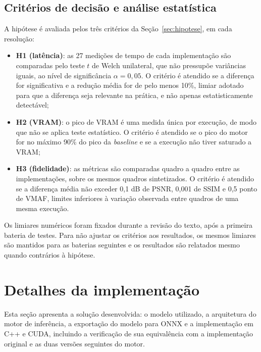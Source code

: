 \documentclass[
    12pt,                %
    openright,           %
    oneside,             %
    a4paper,             %
    english,             %
    brazil               %
]{abntex2}
\begin{document}
\subsection{Critérios de decisão e análise estatística}
\label{sec:criterios}

A hipótese é avaliada pelos três critérios da Seção~\ref{sec:hipotese}, em cada resolução:

\begin{itemize}
    \item \textbf{H1 (latência)}: as 27 medições de tempo de cada implementação são comparadas pelo teste $t$ de Welch unilateral, que não pressupõe variâncias iguais, ao nível de significância $\alpha = 0{,}05$. O critério é atendido se a diferença for significativa e a redução média for de pelo menos 10\%, limiar adotado para que a diferença seja relevante na prática, e não apenas estatisticamente detectável;
    \item \textbf{H2 (VRAM)}: o pico de VRAM é uma medida única por execução, de modo que não se aplica teste estatístico. O critério é atendido se o pico do motor for no máximo 90\% do pico da \textit{baseline} e se a execução não tiver saturado a VRAM;
    \item \textbf{H3 (fidelidade)}: as métricas são comparadas quadro a quadro entre as implementações, sobre os mesmos quadros sintetizados. O critério é atendido se a diferença média não exceder 0,1 dB de PSNR, 0,001 de SSIM e 0,5 ponto de VMAF, limites inferiores à variação observada entre quadros de uma mesma execução.
\end{itemize}

Os limiares numéricos foram fixados durante a revisão do texto, após a primeira bateria de testes. Para não ajustar os critérios aos resultados, os mesmos limiares são mantidos para as baterias seguintes e os resultados são relatados mesmo quando contrários à hipótese.

\section{Detalhes da implementação}
\label{sec:detalhes_implementacao}

Esta seção apresenta a solução desenvolvida: o modelo utilizado, a arquitetura do motor de inferência, a exportação do modelo para ONNX e a implementação em C++ e CUDA, incluindo a verificação de sua equivalência com a implementação original e as duas versões seguintes do motor.
\end{document}
